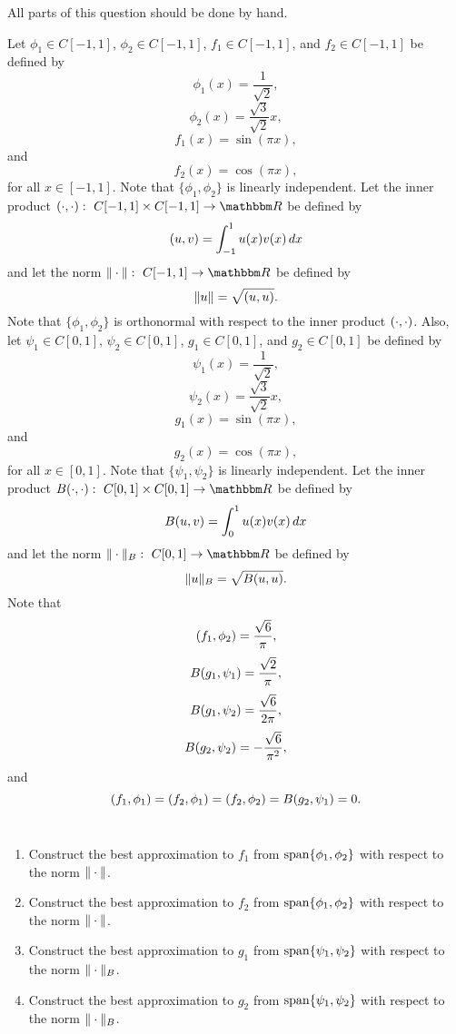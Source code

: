 
All parts of this question should be done by hand.

Let $\phi_1\in C[-1,1]$, $\phi_2\in C[-1,1]$, $f_1\in C[-1,1]$, and $f_2\in C[-1,1]$ be defined by
\[
\phi_1(x) = \frac{1}{\sqrt{2}},
\]
\[
\phi_2(x) = \frac{\sqrt{3}}{\sqrt{2}}x,
\]
\[
f_1(x) = \sin(\pi x),
\]
and
\[
f_2(x) = \cos(\pi x),
\]
for all $x\in[-1,1]$. Note that $\{\phi_1,\phi_2\}$ is linearly independent. Let the inner product $\ip{\cdot,\cdot}:\mbox{ }C[-1,1]\times C[-1,1]\rightarrow\R$ be defined by
\[
(u,v) = \int_{-1}^1 u(x)v(x)\, dx
\]
and let the norm $\norm{\cdot}:\mbox{ }C[-1,1]\rightarrow\R$ be defined by
\[
\|u\| = \sqrt{(u,u)}.
\]
Note that $\{\phi_1,\phi_2\}$ is orthonormal with respect to the inner product $(\cdot,\cdot)$. Also, let $\psi_1\in C[0,1]$, $\psi_2\in C[0,1]$, $g_1\in C[0,1]$, and $g_2\in C[0,1]$ be defined by
\[
\psi_1(x) = \frac{1}{\sqrt{2}},
\]
\[
\psi_2(x) = \frac{\sqrt{3}}{\sqrt{2}}x,
\]
\[
g_1(x) = \sin(\pi x),
\]
and
\[
g_2(x) = \cos(\pi x),
\]
for all $x\in[0,1]$. Note that $\{\psi_1,\psi_2\}$ is linearly independent.  Let the inner product $B\ip{\cdot,\cdot}:\mbox{ }C[0,1]\times C[0,1]\rightarrow\R$ be defined by
\[
B(u,v) = \int_0^1 u(x)v(x)\, dx
\]
and let the norm $\norm{\cdot}_B:\mbox{ }C[0,1]\rightarrow\R$ be defined by
\[
\|u\|_B = \sqrt{B(u,u)}.
\]
Note that
\[
(f_1,\phi_2)={\sqrt{6}\over \pi},
\]
\[
B(g_1,\psi_1)={\sqrt{2}\over \pi},
\]
\[
B(g_1,\psi_2)={\sqrt{6}\over 2\pi},
\]
\[
B(g_2,\psi_2)=-{\sqrt{6}\over \pi^2},
\]
and
\[
(f_1,\phi_1)=(f_2,\phi_1)=(f_2,\phi_2)=B(g_2,\psi_1)=0.
\]
\\
\begin{enumerate}
\item Construct the best approximation to $f_1$ from ${\rm span}\{\phi_1,\phi_2\}$ with respect to the norm $\|\cdot\|$.
\\
\item Construct the best approximation to $f_2$ from ${\rm span}\{\phi_1,\phi_2\}$ with respect to the norm $\|\cdot\|$.
\\
\item Construct the best approximation to $g_1$ from ${\rm span}\{\psi_1,\psi_2\}$ with respect to the norm $\|\cdot\|_B$.
\\
\item Construct the best approximation to $g_2$ from ${\rm span}\{\psi_1,\psi_2\}$ with respect to the norm $\|\cdot\|_B$.
\end{enumerate}




